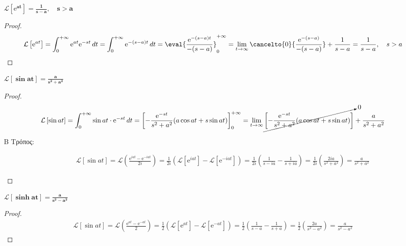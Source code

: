 \begin{example}
  $ \boldsymbol{\mathcal{L}\left[\mathrm{e}^{at}\right] = \frac{1}{s-a}, \quad s > a} $ 
\end{example}
  \begin{proof}
    \[
      \mathcal{L}\left[\mathrm{e}^{at}\right] = \int_{0}^{+\infty} \mathrm{e}^{at} 
      \mathrm{e}^{-st} \,{dt} = \int_{0}^{+\infty} \mathrm{e}^{-(s-a)t} \,{dt} =
      \eval{\frac{\mathrm{e}^{-(s-a)t}}{-(s-a)}} _{0}^{+\infty} = 
      \lim_{t \to \infty} \cancelto{0}{\frac{\mathrm{e}^{-(s-a)}}{-(s-a)}}
      + \frac{1}{s-a} = \frac{1}{s-a}, \quad s > a
    \]
  \end{proof}

\begin{example}
  $ \boldsymbol{\mathcal{L}\left[\sin{at}\right] = \frac{a}{s^{2}+a^{2}}} $
\end{example}
\begin{proof}
  \begin{align*}
    \mathcal{L}\left[\sin{at}\right] &= \int_{0}^{+\infty} \sin{at} \cdot
    \mathrm{e}^{-st} \,{dt} = {\left[- \frac{\mathrm{e}^{-st}}{s^{2}+a^{2}} 
  (a \cos{at} + s \sin{at})\right]} _{0}^{+\infty} = \lim_{t \to \infty} 
    \cancelto{0}{\left[- \frac{\mathrm{e}^{-st}}{s^{2}+a^{2}} (a \cos{at} + s
    \sin{at})\right]} + \frac{a}{s^{2}+a^{2}} \\
  \end{align*} 
  \begin{description}
    \item [Β Τρόπος:]
      \begin{align*}
        \mathcal{L}\left[\sin{at}\right] = \mathcal{L}\left(\frac{\mathrm{e}^{iat} -
        \mathrm{e}^{-iat}}{2i}\right) = \frac{1}{2i} 
        \left(\mathcal{L}[\mathrm{e}^{iat}] - \mathcal{L}[\mathrm{e}^{-iat}]\right) = 
        \frac{1}{2i} \left(\frac{1}{s-ia} - \frac{1}{s+ia}\right) = 
        \frac{1}{2i} \left(\frac{2ia}{s^{2}+a^{2}}\right) = \frac{a}{s^{2}+a^{2}}
      \end{align*}
  \end{description}
\end{proof}

\begin{example}
  $ \boldsymbol{\mathcal{L}\left[\sinh{at}\right] = \frac{a}{s^{2}-a^{2}}} $
\end{example}
\begin{proof}
  \begin{align*}
    \mathcal{L}\left[\sin{at}\right] = \mathcal{L}\left(\frac{\mathrm{e}^{at} -
    \mathrm{e}^{-at}}{2}\right) = \frac{1}{2} 
    \left(\mathcal{L}[\mathrm{e}^{at}] - \mathcal{L}[\mathrm{e}^{-at}]\right) = 
    \frac{1}{2} \left(\frac{1}{s-a} - \frac{1}{s+a}\right) = 
    \frac{1}{2} \left(\frac{2a}{s^{2}-a^{2}}\right) = \frac{a}{s^{2}-a^{2}}
  \end{align*}
\end{proof}


